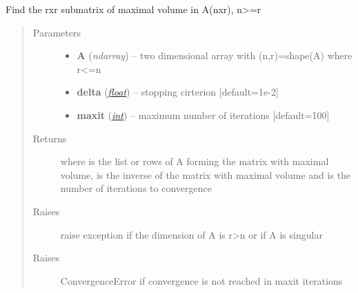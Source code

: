 \documentclass[a4paper,10pt,english]{sphinxmanual}
\begin{document}
\begin{fulllineitems}
\label{api-core:TensorToolbox.core.maxvol}
Find the rxr submatrix of maximal volume in A(nxr), n\textgreater{}=r
\begin{quote}\begin{description}
\item[{Parameters}] \leavevmode\begin{itemize}
\item {} 
\textbf{A} (\emph{ndarray}) -- two dimensional array with (n,r)=shape(A) where r\textless{}=n

\item {} 
\textbf{delta} (\href{http://docs.python.org/library/functions.html\#float}{\emph{float}}) -- stopping cirterion {[}default=1e-2{]}

\item {} 
\textbf{maxit} (\href{http://docs.python.org/library/functions.html\#int}{\emph{int}}) -- maximum number of iterations {[}default=100{]}

\end{itemize}

\item[{Returns}] \leavevmode
{} where  is the list or rows of A forming the matrix with maximal volume,  is the inverse of the matrix with maximal volume and  is the number of iterations to convergence

\item[{Raises}] \leavevmode
raise exception if the dimension of A is r\textgreater{}n or if A is singular

\item[{Raises}] \leavevmode
ConvergenceError if convergence is not reached in maxit iterations

\end{description}\end{quote}

\end{fulllineitems}

\end{document}
